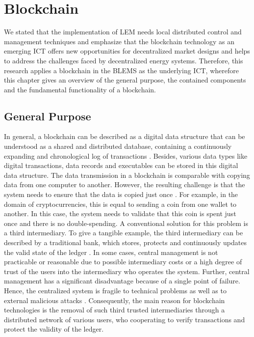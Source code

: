 \section{Blockchain}
\label{sec:about_blockchain}

We stated that the implementation of LEM
needs local distributed control and management techniques and emphasize
that the blockchain technology as an emerging ICT offers new opportunities for decentralized
market designs and helps to address the challenges faced by decentralized energy systems. 
Therefore, this research applies a blockchain in the BLEMS as the underlying ICT, wherefore
this chapter gives an overview of the general purpose, 
the contained components and the fundamental functionality of a blockchain. 

\subsection{General Purpose}
In general, a blockchain can be described as a digital data structure that can be understood as a shared and 
distributed database, containing a continuously expanding and chronological log of transactions . 
Besides, various data types like digital transactions, data records and executables can be stored in this digital data structure. 
The data transmission in a blockchain is comparable with copying data from one computer to another. However, the resulting challenge 
is that the system needs to ensure that the data is copied just once . 
For example, in the domain of cryptocurrencies, this is equal to sending a coin from one wallet to another. 
In this case, the system needs to validate that this coin is spent just once and there is no double-spending. 
A conventional solution for this problem is a third intermediary. To give a tangible example, the third
intermediary can be described by a traditional bank, which stores, protects and continuously updates the valid state of 
the ledger . In some cases, central management is not practicable or reasonable due to 
possible intermediary costs or a high degree of trust of the users into the intermediary who operates 
the system. Further, central management has a significant disadvantage because of a single point of failure. 
Hence, the centralized system is fragile to technical problems as well as to external malicious attacks .
Consequently, the main reason for blockchain technologies is the removal of such third 
trusted intermediaries through a distributed network of various users, who cooperating 
to verify transactions and protect the validity of the ledger.

